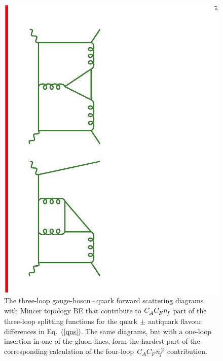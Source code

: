\documentclass[12pt]{article}
\begin{document}
\begin{figure}[bht]
\label{diags1}
\hspace*{3cm}
\includegraphics[bb = 130 110 310 710, scale = 0.5, angle = 270, clip]{nf3loopBE.ps}
\vspace{1mm}
\caption{\small 
The three-loop gauge-boson$\,$--$\,$quark forward scattering diagrams with 
{\sc Mincer} topology BE that contribute to ${C^{}_A} {C^{}_F} {n^{}_{\! f}}$ part of the
three-loop splitting functions for the quark$\,\pm\,$antiquark flavour 
differences in Eq.~(\ref{qns}).
The same diagrams, but with a one-loop insertion in one of the gluon lines, 
form the hardest part of the corresponding calculation of the four-loop 
${C^{}_A} {C^{}_F} {n^{\,2}_{\! f}}$ contribution.}
\vspace*{-1mm}
\end{figure}
\end{document}
